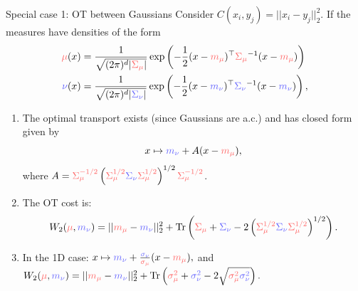 \documentclass[pdf,aspectratio=169,10pt]{beamer}
\begin{document}
\begin{frame}{Special case 1: OT between Gaussians}
\small 
Consider $C(x_i,y_j) =||x_i-y_j||_2^2$. If the measures have densities of the form
\begin{align*}
\centering
 \er{\mu}(x) &= \frac{1}{\sqrt{(2\pi)^d |\er{\Sigma_\mu}|}}\exp\left(-\frac{1}{2} (x-\er{m_\mu})^\top\er{\Sigma_\mu}^{-1}(x-\er{m_\mu}) \right)\\
 \eb{\nu}(x) &= \frac{1}{\sqrt{(2\pi)^d |\eb{\Sigma_\nu}|}}\exp\left(-\frac{1}{2} (x-\eb{m_\nu})^\top\eb{\Sigma_\nu}^{-1}(x-\eb{m_\nu}) \right),
\end{align*}

\begin{enumerate}
    \item The optimal transport exists (since Gaussians are a.c.) and has closed form given by 
    \begin{equation}
        x \mapsto \eb{m_\nu} + A(x-\er{m_\mu}),
    \end{equation}
    where $A = \er{\Sigma^{-1/2}_\mu}\left(\er{\Sigma^{1/2}_\mu}\eb{\Sigma_\nu}\er{\Sigma^{1/2}_\mu}\right)^{1/2}\er{\Sigma^{-1/2}_\mu}$.
    \item The OT cost is: 
    \begin{equation}
        W_2(\er{\mu}, \eb{m_\nu}) = ||\er{m_\mu}-\eb{m_\nu}||^2_2 + \Tr\left(\er{\Sigma_\mu}+\eb{\Sigma_\nu} -2\left(\er{\Sigma^{1/2}_\mu}\eb{\Sigma_\nu}\er{\Sigma^{1/2}_\mu}\right)^{1/2} \right).
    \end{equation}
    \item In the 1D case: $  x \mapsto \eb{m_\nu} + \frac{\eb{\sigma_\nu}}{\er{\sigma_\mu}}(x-\er{m_\mu}),$ and $W_2(\er{\mu}, \eb{m_\nu})  = ||\er{m_\mu}-\eb{m_\nu}||^2_2 + \Tr\left(\er{\sigma^2_\mu}+\eb{\sigma^2_\nu} -2\sqrt{\er{\sigma^2_\mu}\eb{\sigma^2_\nu}} \right).$
\end{enumerate}

\end{frame}
\end{document}
